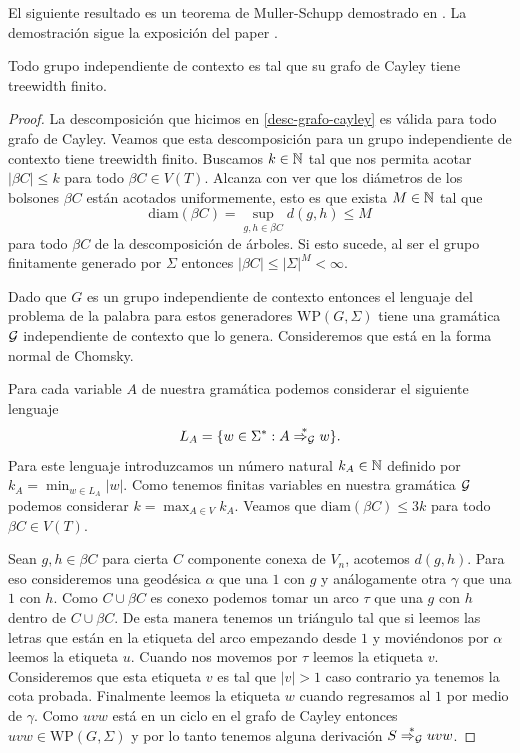 \documentclass[tesis.tex]{subfiles}
\newcommand{\WP}{\text{WP}(G, \Sigma)}
\newcommand{\deriva}{\overset{*}{\Rightarrow_{\cal G}}}
\begin{document}
El siguiente resultado es un teorema de Muller-Schupp demostrado en \cite{muller1985theory}.
La demostración sigue la exposición del paper \cite{diekert_contextfree_2017}.
\begin{teo}  \label{teo_schupp_muller_ic_desc}
	Todo grupo independiente de contexto es tal que su grafo de Cayley tiene treewidth finito.
\end{teo}
\begin{proof}

La descomposición que hicimos en \ref{desc-grafo-cayley} es válida para todo grafo de Cayley. 
Veamos que esta descomposición para un grupo independiente de contexto tiene treewidth finito. 
Buscamos $k \in \mathbb{N}$ tal que nos permita acotar $|\beta C| \le k$ para todo $\beta C \in V(T)$. 
Alcanza con ver que los diámetros de los bolsones $\beta C$ están acotados uniformemente, esto es que exista $M \in \mathbb{N}$ tal que 
\[
\text{diam}(\beta C) =  \sup_{g,h \in \beta C} d(g,h) \le M
\] 
para todo $\beta C$ de la descomposición de árboles.
Si esto sucede, al ser el grupo finitamente generado por $\Sigma$ entonces $|\beta C| \le |\Sigma|^{M} < \infty$.


Dado que $G$ es un grupo independiente de contexto entonces el lenguaje del problema de la palabra para estos generadores $\WP$ tiene una gramática $\cal G$ independiente de contexto que lo genera. 
Consideremos que está en la forma normal de Chomsky.

Para cada variable $A$ de nuestra gramática podemos considerar el siguiente lenguaje
\[
L_A = \{ w \in \Sigma^* : A \deriva w  \}.
\]
Para este lenguaje introduzcamos un número natural $k_A \in \mathbb{N}$ definido por $k_A = \min_{w \in L_A} |w|$. 
Como tenemos finitas variables en nuestra gramática $\cal G$ podemos considerar $k = \max_{A \in V} k_A$. 
Veamos que $\text{diam}(\beta C) \le 3k$ para todo $\beta C \in V(T)$.

Sean $g,h \in \beta C$ para cierta $C$ componente conexa de $V_n$, acotemos $d(g,h)$. 
Para eso consideremos una geodésica $\alpha$ que una $1$ con $g$ y análogamente otra $\gamma$ que una $1$ con $h$. 
Como $C \cup \beta C$ es conexo podemos tomar un arco $\tau$ que una $g$ con  $h$ dentro de $C \cup \beta C$. 
De esta manera tenemos un triángulo tal que si leemos las letras que están en la etiqueta del arco empezando desde $1$ y moviéndonos por $\alpha$ leemos la etiqueta $u$. 
Cuando nos movemos por $\tau$ leemos la etiqueta $v$. Consideremos que esta etiqueta $v$ es tal que $|v|>1$ caso contrario ya tenemos la cota probada. Finalmente leemos la etiqueta $w$ cuando regresamos al $1$ por medio de $\gamma$.
Como $uvw$ está en un ciclo en el grafo de Cayley entonces $uvw \in  \WP$ y por lo tanto tenemos alguna derivación $S \deriva uvw$.


\end{proof}
\end{document}
